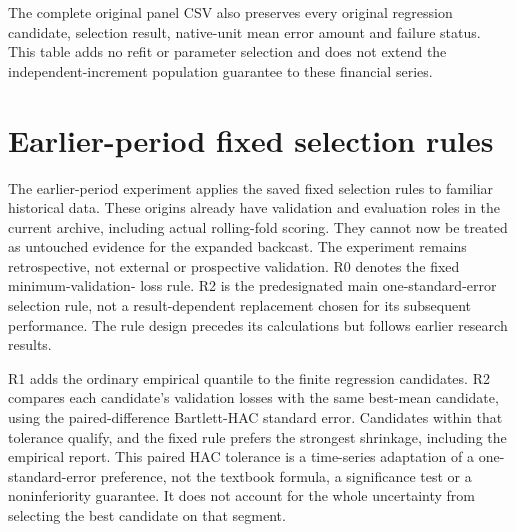 \documentclass[11pt,a4paper]{article}
\begin{document}
The complete original panel CSV also preserves every original
regression candidate, selection result, native-unit mean error amount and
failure status. This table adds no refit or parameter selection and does not
extend the independent-increment population guarantee to these financial
series.\section{Earlier-period fixed selection rules}\label{sup:selection}

The earlier-period experiment applies the saved fixed selection rules
to familiar historical data. These origins already have validation and
evaluation roles in the current archive, including actual rolling-fold
scoring. They cannot now be treated as untouched evidence for the expanded
backcast. The experiment remains retrospective, not external or prospective
validation. R0 denotes the fixed minimum-validation-
loss rule. R2 is the predesignated main one-standard-error selection rule,
not a result-dependent replacement chosen for its subsequent performance.
The rule design precedes its calculations but follows earlier research results.

R1 adds the ordinary empirical quantile to the finite regression candidates.
R2 compares each candidate's validation losses with the same best-mean
candidate, using the paired-difference Bartlett-HAC standard error. Candidates
within that tolerance qualify, and the fixed rule prefers the strongest
shrinkage, including the empirical report. This paired HAC tolerance is a
time-series adaptation of a one-standard-error preference, not the textbook
formula, a significance test or a noninferiority guarantee. It does not account
for the whole uncertainty from selecting the best candidate on that segment.
\end{document}
